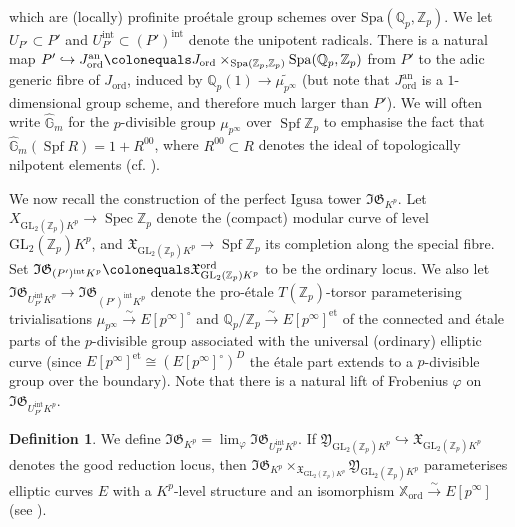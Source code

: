 \documentclass[10pt, oneside]{amsart}
\newcommand{\defeq}{\colonequals}
\renewcommand{\tilde}{\widetilde}
\numberwithin{equation}{subsection}
\theoremstyle{definition}
\newtheorem{definition}[equation]{Definition}
\theoremstyle{remark}
\newcommand{\mbb}[1]{\mathbb{#1}}
\newcommand{\opn}[1]{\operatorname{#1}}
\DeclareMathOperator{\Spec}{Spec}
\def\Q{\mathbb{Q}}
\def\Z{{\mathbb{Z}}}
\def\Spa{\mathrm{Spa}}
\begin{document}
which are (locally) profinite pro\'{e}tale group schemes over $\Spa(\Q_p,\Z_p)$. We let $U_{P'} \subset P'$ and $U_{P'}^{\opn{int}} \subset (P')^{\opn{int}}$ denote the unipotent radicals. There is a natural map $P' \hookrightarrow J_{\opn{ord}}^{\opn{an}} \defeq J_{\opn{ord}} \times_{\Spa (\Z_p, \Z_p)} \Spa (\Q_p, \Z_p)$ from $P'$ to the adic generic fibre of $J_{\opn{ord}}$, induced by $\Q_p(1) \rightarrow  \tilde{ \mu_{p^\infty}}$ (but note that $J_{\opn{ord}}^{\opn{an}}$ is a $1$-dimensional group scheme, and therefore much larger than $P'$). We will often write $\widehat{\mbb{G}}_m$ for the $p$-divisible group $\mu_{p^{\infty}}$ over $\opn{Spf}\mbb{Z}_p$ to emphasise the fact that $\widehat{\mbb{G}}_m(\opn{Spf}R) = 1 + R^{00}$, where $R^{00} \subset R$ denotes the ideal of topologically nilpotent elements (cf. \cite[Remark 2.1.3]{howe2020unipotent}).
 
We now recall the construction of the perfect Igusa tower $\mathfrak{IG}_{K^p}$. Let ${X}_{\mathrm{GL}_2(\Z_p)K^p} \rightarrow \Spec \Z_p $ denote the (compact) modular curve of level $\mathrm{GL}_2(\Z_p)K^p$, and $\mathfrak{X}_{\mathrm{GL}_2(\Z_p)K^p} \rightarrow \opn{Spf} \Z_p$ its completion along the special fibre. Set $\mathfrak{IG}_{(P')^{\opn{int}}K^p} \defeq \mathfrak{X}^{\opn{ord}}_{\mathrm{GL}_2(\Z_p)K^p}$ to be the ordinary locus. We also let $\mathfrak{IG}_{U_{P'}^{\opn{int}}K^p} \to \mathfrak{IG}_{(P')^{\opn{int}}K^p}$ denote the pro-\'{e}tale $T(\mbb{Z}_p)$-torsor parameterising trivialisations $\mu_{p^{\infty}} \xrightarrow{\sim} E[p^\infty]^{\circ}$ and $\Q_p/\Z_p \xrightarrow{\sim} E[p^\infty]^{\mathrm{et}}$ of the connected and \'{e}tale parts of the $p$-divisible group associated with the universal (ordinary) elliptic curve (since $E[p^\infty]^{\mathrm{et}} \cong (E[p^\infty]^{\circ})^D$ the \'{e}tale part extends to a $p$-divisible group over the boundary). Note that there is a natural lift of Frobenius $\varphi$ on $\mathfrak{IG}_{U_{P'}^{\opn{int}}K^p}$.
 
\begin{definition}
We define $\mathfrak{IG}_{K^p} = \lim_{\varphi} \mathfrak{IG}_{U_{P'}^{\opn{int}}K^p}$.  If $\mathfrak{Y}_{\mathrm{GL}_2(\Z_p)K^p} \hookrightarrow \mathfrak{X}_{\mathrm{GL}_2(\Z_p)K^p}$ denotes the good reduction locus, then $\mathfrak{IG}_{K^p} \times_{\mathfrak{X}_{\mathrm{GL}_2(\Z_p)K^p}}  \mathfrak{Y}_{\mathrm{GL}_2(\Z_p)K^p}$ parameterises elliptic curves $E$ with a $K^p$-level structure and an isomorphism $\mathbb{X}_{\opn{ord}} \xrightarrow{\sim} E[p^\infty]$ (see \cite[\S 4.3]{CS17}).
\end{definition}
\end{document}
